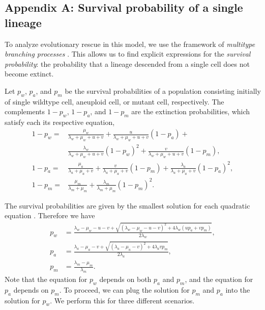 \documentclass[12pt]{extarticle}
\begin{document}
\begin{appendices}
\renewcommand{\theequation}{\thesection\arabic{equation}}

\section*{Appendix A: Survival probability of a single lineage}\label{sec:appendix-surv-prob}

To analyze evolutionary rescue in this model, we use the framework of \emph{multitype branching processes} \citep{rybnikov2021fitness,harris1963theory}. 
This allows us to find explicit expressions for the \emph{survival probability}: the probability that a lineage descended from a single cell does not become extinct.

Let $p_w$, $p_a$, and $p_m$ be the survival probabilities of a population consisting initially of single wildtype cell, aneuploid cell, or mutant cell, respectively.
The complements $1-p_w$, $1-p_a$, and $1-p_m$ are the extinction probabilities, which satisfy each its respective equation,
\begin{equation} \label{eq:extinction_prob}
\begin{aligned}
1-p_w = &\frac{\mu_w}{\lambda_w+\mu_w+u+v} + 
		  \frac{u}{\lambda_w+\mu_w+u+v}\left(1-p_a\right) + \\
		  & \frac{\lambda_w}{\lambda_w+\mu_w+u+v}\left(1-p_w\right)^2 +
		  \frac{v}{\lambda_w+\mu_w+u+v}\left(1-p_m\right) ,\\
1-p_a = &\frac{\mu_a}{\lambda_a+\mu_a+v}+\frac{v}{\lambda_a+\mu_a+v}\left(1-p_m\right)+\frac{\lambda_a}{\lambda_a+\mu_a+v}\left(1-p_a\right)^2 ,\\
1-p_m = &\frac{\mu_m}{\lambda_m+\mu_m}+\frac{\lambda_m}{\lambda_m+\mu_m}\left(1-p_m\right)^2 .	 
\end{aligned}
\end{equation}

The survival probabilities are given by the smallest solution for each quadratic equation \citep{uecker2015adaptive}. Therefore we have
\begin{equation}\label{eq:survival_prob}
\begin{aligned}
p_w &= \frac{\lambda_w-\mu_w-u-v+\sqrt{\left(\lambda_w-\mu_w-u-v\right)^2+4\lambda_w\left(up_a+vp_m\right)}}{2\lambda_w} ,\\
p_a &= \frac{\lambda_a-\mu_a-v+\sqrt{\left(\lambda_a-\mu_a-v\right)^2+4\lambda_avp_m}}{2\lambda_a}, \\
p_m &= \frac{\lambda_m-\mu_m}{\lambda_m} .
\end{aligned} 
\end{equation}
Note that the equation for $p_w$ depends on both $p_a$ and $p_m$, and the equation for $p_a$ depends on $p_m$.
To proceed, we can plug the solution for $p_m$ and $p_a$ into the solution for $p_w$. We perform this for three different scenarios.


\end{appendices}
\end{document}
